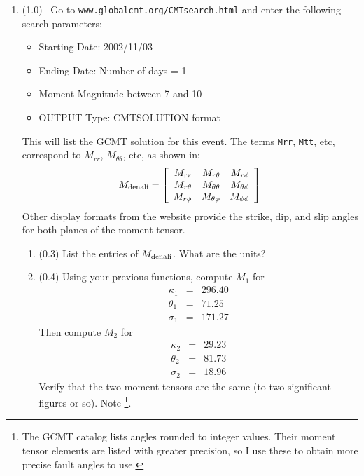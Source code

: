 \documentclass[11pt,titlepage,fleqn]{article}
\newcommand{\Mmat}{M}
\begin{document}
\begin{enumerate}

\item (1.0) \ptag\ Go to \verb+www.globalcmt.org/CMTsearch.html+ and enter the following search parameters:

\begin{itemize}
\item Starting Date: 2002/11/03
\item Ending Date: Number of days = 1
\item Moment Magnitude between 7 and 10
\item OUTPUT Type: CMTSOLUTION format
\end{itemize}
%
This will list the GCMT solution for this event. The terms \verb+Mrr+, \verb+Mtt+, etc, correspond to $M_{rr}$, $M_{\theta\theta}$, etc, as shown in:
%
\begin{equation}
\Mmat_{\rm denali} =
\left[ \begin{array}{rrr}
   M_{rr}     &  M_{r\theta}     & M_{r\phi}  \\
   M_{r\theta}  &  M_{\theta\theta} &  M_{\theta\phi}  \\
   M_{r\phi}   &  M_{\theta\phi}   &  M_{\phi\phi}
\end{array} \right]
\end{equation}
%
Other display formats from the website provide the strike, dip, and slip angles for both planes of the moment tensor.

\begin{enumerate}
\item (0.3) List the entries of $\Mmat_{\rm denali}$. What are the units?

\item (0.4) Using your previous functions, compute $\Mmat_1$ for 
%
\begin{eqnarray*}
\kappa_1 &=& 296.40
\\
\theta_1 &=& 71.25
\\
\sigma_1 &=& 171.27
\end{eqnarray*}
%
Then compute $\Mmat_2$ for
%
\begin{eqnarray*}
\kappa_2 &=& 29.23
\\
\theta_2 &=& 81.73
\\
\sigma_2 &=& 18.96
\end{eqnarray*}
%
 Verify that the two moment tensors are the same (to two significant figures or so). Note \footnote{The GCMT catalog lists angles rounded to integer values. Their moment tensor elements are listed with greater precision, so I use these to obtain more precise fault angles to use.}.


\end{enumerate}
\end{enumerate}
\end{document}
